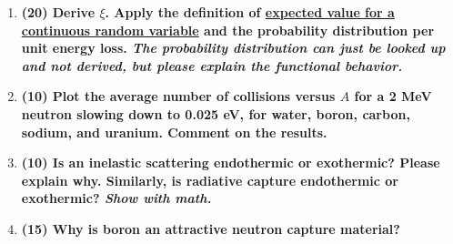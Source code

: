 \documentclass[11pt,a4paper]{article}
\begin{document}
\begin{enumerate}[leftmargin=*,topsep=0pt,font=\bfseries]
        
        \newpage
    \item\textbf{(20) Derive $\xi$. Apply the definition of \href{https://courses.lumenlearning.com/uidaho-riskassessment/chapter/statistical-moments/}{expected value for a continuous random variable} and the probability distribution per unit energy loss. \textit{The probability distribution can just be looked up and not derived, but please explain the functional behavior.}}
        \vspace{0.25in}\\
        
        
        
        
        
        
        
        
        
        
        
        
        
        
        \newpage
    \item\textbf{(10) Plot the average number of collisions versus $A$ for a 2 MeV neutron slowing down to 0.025 eV, for water, boron, carbon, sodium, and uranium. Comment on the results.}
        \vspace{0.25in}\\
        
        
        
        
        
        
        
        
        
        
        
        
        
        
        \newpage
    \item\textbf{(10) Is an inelastic scattering endothermic or exothermic? Please explain why. Similarly, is radiative capture endothermic or exothermic? \textit{Show with math.}}
        \vspace{0.25in}\\
        
        
        
        
        
        
        
        
        
        
        
        
        
        
        \newpage
    \item\textbf{(15) Why is boron an attractive neutron capture material?}
        \vspace{0.25in}\\
        

\end{enumerate}
\end{document}
